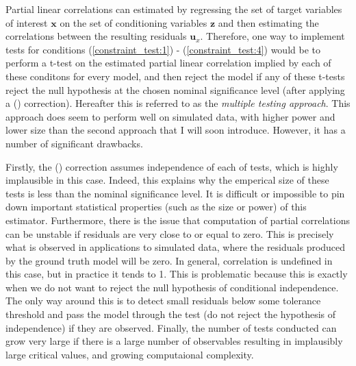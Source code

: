 \documentclass{article}
\begin{document}
Partial linear correlations can estimated by regressing the set of target variables of interest $\mathbf{x}$ on the set of conditioning variables $\mathbf{z}$ and then estimating the correlations between the resulting residuals $\mathbf{u}_x$. Therefore, one way to implement tests for conditions (\ref{constraint_test:1}) - (\ref{constraint_test:4}) would be to perform a t-test on the estimated partial linear correlation implied by each of these conditons for every model, and then reject the model if any of these t-tests reject the null hypothesis at the chosen nominal significance level (after applying a \citeauthor{bonferroni1936teoria} (\citeyear{bonferroni1936teoria}) correction). Hereafter this is referred to as the \textit{multiple testing approach}. This approach does seem to perform well on simulated data, with higher power and lower size than the second approach that I will soon introduce. However, it has a number of significant drawbacks. 

Firstly, the \citeauthor{bonferroni1936teoria} (\citeyear{bonferroni1936teoria}) correction assumes independence of each of tests, which is highly implausible in this case. Indeed, this explains why the emperical size of these tests is less than the nominal significance level. It is difficult or impossible to pin down important statistical properties (such as the size or power) of this estimator. Furthermore, there is the issue that computation of partial correlations can be unstable if residuals are very close to or equal to zero. This is precisely what is observed in applications to simulated data, where the residuals produced by the ground truth model will be zero. In general, correlation is undefined in this case, but in practice it tends to 1. This is problematic because this is exactly when we do not want to reject the null hypothesis of conditional independence. The only way around this is to detect small residuals below some tolerance threshold and pass the model through the test (do not reject the hypothesis of independence) if they are observed. Finally, the number of tests conducted can grow very large if there is a large number of observables resulting in implausibly large critical values, and growing computaional complexity.
\end{document}
